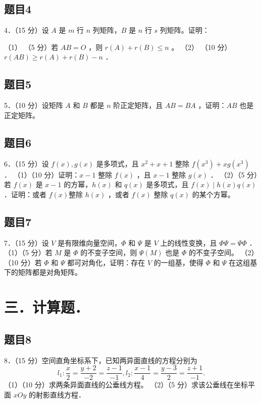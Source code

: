 \documentclass{article}
\begin{document}
\subsection{题目4}
4．（15 分）设 \(A\) 是 \(m\) 行 \(n\) 列矩阵，\(B\) 是 \(n\) 行 \(s\) 列矩阵。证明：

（1） （5 分）若 \(A B=O\) ，则 \(r(A)+r(B) \leq n\) 。
（2） （10 分）\(r(A B) \geq r(A)+r(B)-n\) ．

\subsection{题目5}
5．（10 分）设矩阵 \(A\) 和 \(B\) 都是 \(n\) 阶正定矩阵，且 \(A B=B A\) ，证明：\(A B\) 也是正定矩阵。

\subsection{题目6}
6．（15 分）设 \(f(x), g(x)\) 是多项式，且 \(x^{2}+x+1\) 整除 \(f\left(x^{3}\right)+x g\left(x^{3}\right)\) ．
（1）（10 分）证明：\(x-1\) 整除 \(f(x)\) ，且 \(x-1\) 整除 \(g(x)\) ．
（2）（5 分）若 \(f(x)\) 是 \(x-1\) 的方幂，\(h(x)\) 和 \(q(x)\) 是多项式，且 \(f(x) \mid h(x) q(x)\) ．证明：或者 \(f(x)\)整除 \(h(x)\) ，或者 \(f(x)\) 整除 \(q(x)\) 的某个方幂。

\subsection{题目7}
7．（15 分）设 \(V\) 是有限维向量空间，\(\Phi\) 和 \(\Psi\) 是 \(V\) 上的线性变换，且 \(\Phi \Psi=\Psi \Phi\) ．
（1）（5 分）若 \(M\) 是 \(\Phi\) 的不变子空间，则 \(\Psi(M)\) 也是 \(\Phi\) 的不变子空间。
（2）（10 分）若 \(\Phi\) 和 \(\Psi\) 都可对角化，证明：存在 \(V\) 的一组基，使得 \(\Phi\) 和 \(\Psi\) 在这组基下的矩阵都是对角矩阵。

\section*{三．计算题．}

\subsection{题目8}
8．（15 分）空间直角坐标系下，已知两异面直线的方程分别为
\[
l_{1}: \frac{x}{2}=\frac{y+2}{-2}=\frac{z-1}{-1}, l_{2}: \frac{x-1}{4}=\frac{y-3}{2}=\frac{z+1}{-1} .
\]
（1）（10 分）求两条异面直线的公垂线方程。
（2）（5 分）求该公垂线在坐标平面 \(x O y\) 的射影直线方程．
\end{document}
